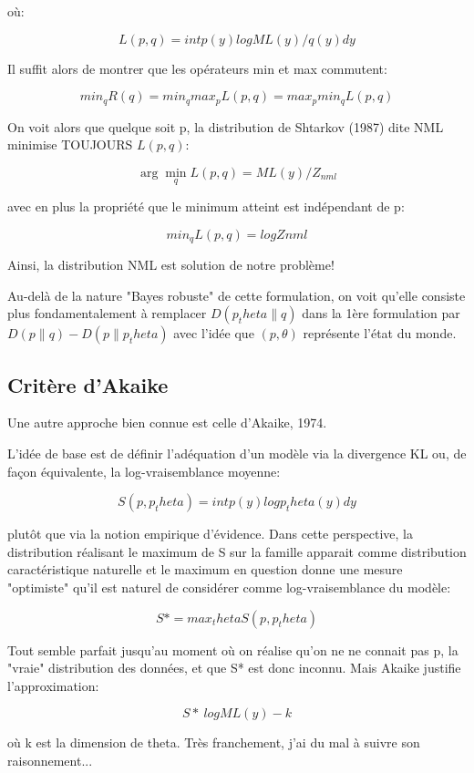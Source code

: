 \documentclass{article}
\begin{document}
o\`u: 

$$L(p, q) = int p(y) log ML(y) / q(y) dy$$ 

Il suffit alors de montrer que les op\'erateurs min et max commutent:  

$$min_q R(q) = min_q max_p L(p, q) = max_p min_q L(p, q)$$ 

On voit alors que quelque soit p, la distribution de Shtarkov (1987) dite NML minimise TOUJOURS $L(p, q)$: 

$$\arg\min_q L(p, q) = ML(y) / Z_{nml}$$ 

avec en plus la propri\'et\'e que le minimum atteint est ind\'ependant de p: 

$$min_q L(p, q) = log Znml$$ 

Ainsi, la distribution NML est solution de notre probl\`eme! 

Au-del\`a de la nature "Bayes robuste" de cette formulation, on voit qu'elle consiste plus fondamentalement \`a remplacer $D(p_theta\|q)$ dans la 1\`ere formulation par $D(p\|q) - D(p\|p_theta)$ avec l'id\'ee que $(p,\theta)$ repr\'esente l'\'etat du monde. 


\subsection{Crit\`ere d'Akaike}

Une autre approche bien connue est celle d'Akaike, 1974. 

L'id\'ee de base est de d\'efinir l'ad\'equation d'un mod\`ele via la divergence KL ou, de fa\c{c}on \'equivalente, la log-vraisemblance moyenne: 

$$S(p, p_theta) = int p(y) log p_theta(y) dy$$ 

plut\^ot que via la notion empirique d'\'evidence. Dans cette perspective, la distribution r\'ealisant le maximum de S sur la famille apparait comme distribution caract\'eristique naturelle et le maximum en question donne une mesure "optimiste" qu'il est naturel de consid\'erer comme log-vraisemblance du mod\`ele: 

$$S* = max_theta S(p, p_theta)$$ 

Tout semble parfait jusqu'au moment o\`u on r\'ealise qu'on ne ne connait pas p, la "vraie" distribution des donn\'ees, et que S* est donc inconnu. Mais Akaike justifie l'approximation: 

$$S* ~ log ML(y) - k$$ 

o\`u k est la dimension de theta. Tr\`es franchement, j'ai du mal \`a suivre son raisonnement... 
\end{document}
